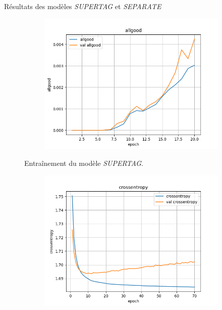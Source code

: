 \documentclass[11pt]{beamer}
\begin{document}
\begin{frame}{Résultats des modèles \textit{SUPERTAG} et \textit{SEPARATE}}
\begin{figure}
\begin{subfigure}{0.32\textwidth}
            \centering
            \includegraphics[width=\linewidth]{../logs/supertag/allgood.png}
        \end{subfigure}
        \caption{Entraînement du modèle \textit{SUPERTAG}.}
        \label{fig: results supertag}
    \end{figure}
    \begin{figure}
        \centering
        \begin{subfigure}{0.32\textwidth}
            \centering
            \includegraphics[width=\linewidth]{../logs/separate/crossentropy.png}
        \end{subfigure}
        \begin{subfigure}{0.32\textwidth}
            \centering

\end{subfigure}
\end{figure}
\end{frame}
\end{document}
